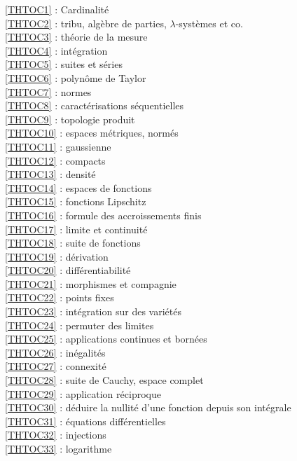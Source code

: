 \ref {THTOC1} : Cardinalité\\
\ref {THTOC2} : tribu, algèbre de parties, \( \lambda \)-systèmes et co.\\
\ref {THTOC3} : théorie de la mesure\\
\ref {THTOC4} : intégration\\
\ref {THTOC5} : suites et séries\\
\ref {THTOC6} : polynôme de Taylor\\
\ref {THTOC7} : normes\\
\ref {THTOC8} : caractérisations séquentielles\\
\ref {THTOC9} : topologie produit\\
\ref {THTOC10} : espaces métriques, normés\\
\ref {THTOC11} : gaussienne\\
\ref {THTOC12} : compacts\\
\ref {THTOC13} : densité\\
\ref {THTOC14} : espaces de fonctions\\
\ref {THTOC15} : fonctions Lipschitz\\
\ref {THTOC16} : formule des accroissements finis\\
\ref {THTOC17} : limite et continuité\\
\ref {THTOC18} : suite de fonctions\\
\ref {THTOC19} : dérivation\\
\ref {THTOC20} : différentiabilité\\
\ref {THTOC21} : morphismes et compagnie\\
\ref {THTOC22} : points fixes\\
\ref {THTOC23} : intégration sur des variétés\\
\ref {THTOC24} : permuter des limites\\
\ref {THTOC25} : applications continues et bornées\\
\ref {THTOC26} : inégalités\\
\ref {THTOC27} : connexité\\
\ref {THTOC28} : suite de Cauchy, espace complet\\
\ref {THTOC29} : application réciproque\\
\ref {THTOC30} : déduire la nullité d'une fonction depuis son intégrale\\
\ref {THTOC31} : équations différentielles\\
\ref {THTOC32} : injections\\
\ref {THTOC33} : logarithme\\
